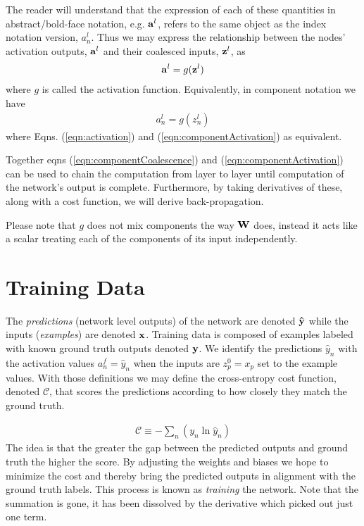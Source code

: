 \documentclass[twocolumn]{revtex4-1}
\newcommand{\bld}[1]{\vectorbold{#1}}
\newcommand{\cC}{\mathscr{C}}
\begin{document}
The reader will understand that the expression of each of these quantities in abstract/bold-face notation, e.g. $\bld{a}^l$, refers to the same object as the index notation version, $a^l_n$. Thus we may express the relationship between the nodes' activation outputs, $\bld{a}^l$ and their coalesced inputs, $\bld{z}^l$, as 
\begin{align}
    \label{eqn:activation}
    \bld{a}^l = g(\bld{z}^l)
\end{align}
where $g$ is called the activation function. Equivalently, in component notation we have
\begin{align}
    \label{eqn:componentActivation}
    a^l_n = g(z^l_n)
\end{align}
where Eqns. (\ref{eqn:activation}) and (\ref{eqn:componentActivation}) as equivalent.

Together eqns (\ref{eqn:componentCoalescence}) and (\ref{eqn:componentActivation}) can be used to chain the computation from layer to layer until computation of the network's output is complete. Furthermore, by taking derivatives of these, along with a cost function, we will derive back-propagation.

Please note that $g$ does not mix components the way $\bld{W}$ does, instead it acts like a scalar treating each of the components of its input independently. 

\section{Training Data}
The \textit{predictions} (network level outputs) of the network are denoted $\bld{\hat{y}}$ while the inputs (\textit{examples}) are denoted $\bld{x}$. Training data is composed of examples labeled with known ground truth outputs denoted $\bld{y}$. We identify the predictions $\hat{y}_n$ with the activation values $a^f_n = \hat{y}_n$ when the inputs are $z^0_p = x_p$ set to the example values. With those definitions we may define the cross-entropy cost function, denoted $\mathscr{C}$, that scores the predictions according to how closely they match the ground truth.

\begin{align}
    \label{eqn:costDefn}
    \cC \equiv - \sum_n \left(y_n \ln \hat{y}_n \right)
\end{align}
The idea is that the greater the gap between the predicted outputs and ground truth the higher the score. By adjusting the weights and biases we hope to minimize the cost and thereby bring the predicted outputs in alignment with the ground truth labels. This process is known as \textit{training} the network. Note that the summation is gone, it has been dissolved by the derivative which picked out just one term.
\end{document}
